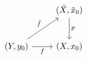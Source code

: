 \documentclass{article}
\begin{document}
    \begin{equation*}
        \begin{tikzcd}[row sep = 0.35in]
            & (\tilde{X},\tilde{x}_0) \ar[d, "p"] \\
            \tpl{Y,y_0} \ar[ur, "\tilde{f}"] \ar[r, "f"'] & \tpl{X,x_0}
        \end{tikzcd}
    \end{equation*}
\end{document}
